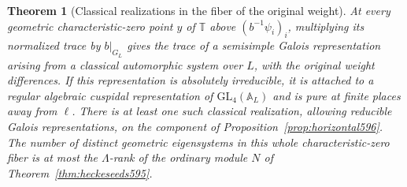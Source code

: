 \documentclass[a4paper,11pt]{article}
\newtheorem{theorem}[proposition]{Theorem}
\theoremstyle{definition}
\theoremstyle{remark}
\numberwithin{equation}{section}
\begin{document}
\begin{theorem}[Classical realizations in the fiber of the original weight]
\leavevmode\label{thm:classicalfiber596}
At every geometric characteristic-zero point \(y\) of
\(\mathbb T\) above \((b^{-1}\psi_i)_i\), multiplying its
normalized trace by \(b|_{G_L}\) gives the trace of a
semisimple Galois representation arising from a classical
automorphic system over \(L\), with the original weight
differences. If this representation is absolutely irreducible,
it is attached to a regular algebraic cuspidal representation
of \(\mathrm{GL}_4(\mathbb A_L)\) and is pure at finite places
away from \(\ell\). There is at least one such classical
realization, allowing reducible Galois representations,
on the component of Proposition~\ref{prop:horizontal596}.
The number of distinct geometric eigensystems in this
whole characteristic-zero fiber is at most the
\(\Lambda\)-rank of the ordinary module \(N\) of
Theorem~\ref{thm:heckeseeds595}.
\end{theorem}
\end{document}
